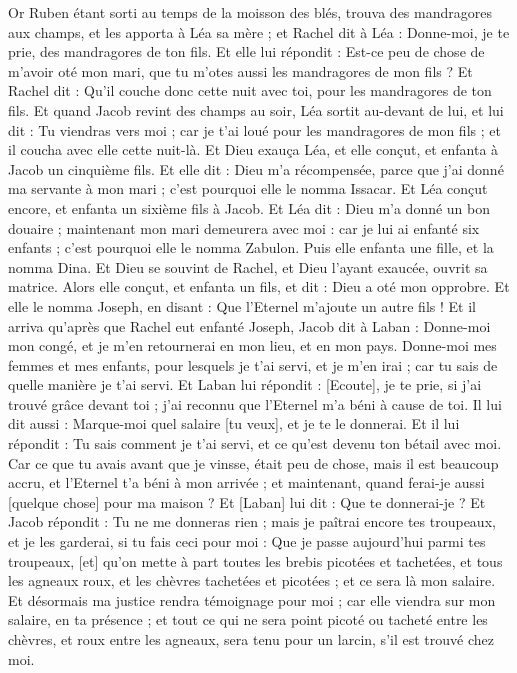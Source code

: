\begin{multicols}{2}
Or Ruben étant sorti au temps de la moisson des blés, trouva des mandragores aux champs, et les apporta à Léa sa mère ; et Rachel dit à Léa : Donne-moi, je te prie, des mandragores de ton fils.
Et elle lui répondit : Est-ce peu de chose de m'avoir oté mon mari, que tu m'otes aussi les mandragores de mon fils ? Et Rachel dit : Qu'il couche donc cette nuit avec toi, pour les mandragores de ton fils.
Et quand Jacob revint des champs au soir, Léa sortit au-devant de lui, et lui dit : Tu viendras vers moi ; car je t'ai loué pour les mandragores de mon fils ; et il coucha avec elle cette nuit-là.
Et Dieu exauça Léa, et elle conçut, et enfanta à Jacob un cinquième fils.
Et elle dit : Dieu m'a récompensée, parce que j'ai donné ma servante à mon mari ; c'est pourquoi elle le nomma Issacar.
Et Léa conçut encore, et enfanta un sixième fils à Jacob.
Et Léa dit : Dieu m'a donné un bon douaire ; maintenant mon mari demeurera avec moi : car je lui ai enfanté six enfants ; c'est pourquoi elle le nomma Zabulon.
Puis elle enfanta une fille, et la nomma Dina.
Et Dieu se souvint de Rachel, et Dieu l'ayant exaucée, ouvrit sa matrice.
Alors elle conçut, et enfanta un fils, et dit : Dieu a oté mon opprobre.
Et elle le nomma Joseph, en disant : Que l'Eternel m'ajoute un autre fils !
Et il arriva qu'après que Rachel eut enfanté Joseph, Jacob dit à Laban : Donne-moi mon congé, et je m'en retournerai en mon lieu, et en mon pays.
Donne-moi mes femmes et mes enfants, pour lesquels je t'ai servi, et je m'en irai ; car tu sais de quelle manière je t'ai servi.
Et Laban lui répondit : [Ecoute], je te prie, si j'ai trouvé grâce devant toi ; j'ai reconnu que l'Eternel m'a béni à cause de toi.
Il lui dit aussi : Marque-moi quel salaire [tu veux], et je te le donnerai.
Et il lui répondit : Tu sais comment je t'ai servi, et ce qu'est devenu ton bétail avec moi.
Car ce que tu avais avant que je vinsse, était peu de chose, mais il est beaucoup accru, et l'Eternel t'a béni à mon arrivée ; et maintenant, quand ferai-je aussi [quelque chose] pour ma maison ?
Et [Laban] lui dit : Que te donnerai-je ? Et Jacob répondit : Tu ne me donneras rien ; mais je paîtrai encore tes troupeaux, et je les garderai, si tu fais ceci pour moi :
Que je passe aujourd'hui parmi tes troupeaux, [et] qu'on mette à part toutes les brebis picotées et tachetées, et tous les agneaux roux, et les chèvres tachetées et picotées ; et ce sera là mon salaire.
Et désormais ma justice rendra témoignage pour moi ; car elle viendra sur mon salaire, en ta présence ; et tout ce qui ne sera point picoté ou tacheté entre les chèvres, et roux entre les agneaux, sera tenu pour un larcin, s'il est trouvé chez moi.

\end{multicols}
